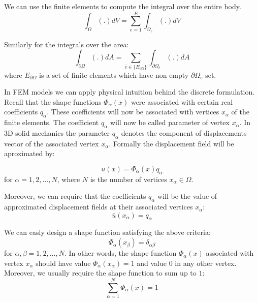 \documentclass[en]{minipw} %
\begin{document}
We can use the finite elements to compute the integral over the entire body.
\begin{equation}
\int_{\Omega} (.) dV = \sum^{E}_{e=1} \int_{\Omega_{e}}(.) dV
\end{equation}

Similarly for the integrals over the area:
\begin{equation}
\int_{\partial \Omega} (.) dA = \sum_{\bar{e} \in \{ E_{\partial \Omega} \}} \int_{\partial \Omega_{\bar{e}}}(.) dA
\end{equation}
where $E_{\partial \Omega}$ is a set of finite elements which have non empty $\partial \Omega_{\bar{e}}$ set.

In FEM models we can apply physical intuition behind the discrete formulation. Recall that the shape functions $\Phi_{\alpha}(x)$ were associated with certain real coefficients $q_{\alpha}$. These coefficients will now be associated with vertices $x_{\alpha}$ of the finite elements. The coefficient $q_{\alpha}$ will now be called parameter of vertex $x_{\alpha}$. In 3D solid mechanics the parameter  $q_{\alpha}$ denotes the component of displacements vector of the associated vertex $x_{\alpha}$. Formally the displacement field will be aproximated by:

\begin{equation}
\bar{u}(x) = \Phi_{\alpha}(x)q_{\alpha}
\end{equation}
for $\alpha = 1,2,...,N$, where $N$ is the number of vertices $x_{\alpha} \in \Omega$.

Moreover, we can require that the coefficients $q_{\alpha}$ will be the value of approximated displacement fields at their associated vertices $x_{\alpha}$:
\begin{equation}
\bar{u}(x_{\alpha}) = q_{\alpha}
\end{equation}

We can easly design a shape function satisfying the above criteria:
\begin{equation}
\Phi_{\alpha}(x_{\beta}) = \delta_{\alpha \beta}
\end{equation}
for $\alpha , \beta = 1,2,...,N$. In other words, the shape function $\Phi_{\alpha}(x)$ associated with vertex $x_{\alpha}$ should have value $\Phi_{\alpha}(x_{\alpha}) = 1$ and value $0$ in any other vertex. 
Moreover, we usually require the shape function to sum up to $1$:
\begin{equation}
\sum^{N}_{\alpha = 1}\Phi_{\alpha}(x) = 1
\end{equation}
\end{document}

